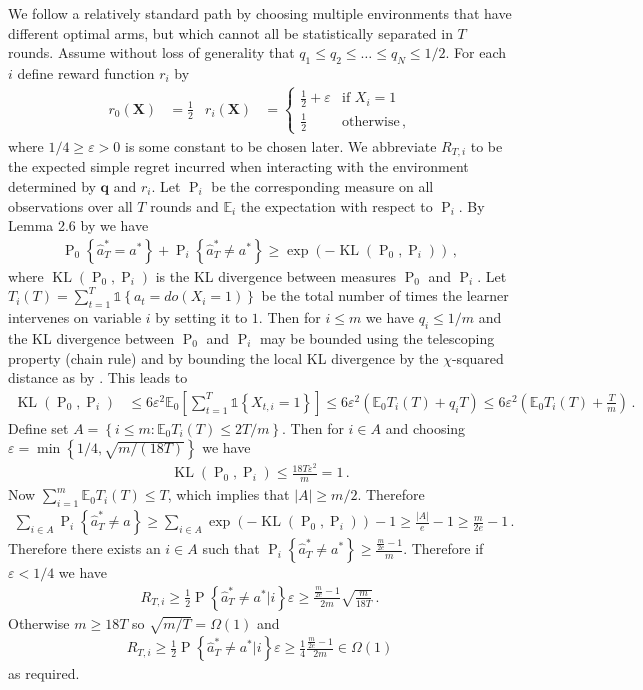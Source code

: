 \documentclass{article}
\newcommand{\set}[1]{\left\{#1\right\}}
\newcommand{\ind}[1]{\mathds{1}\!\!\set{#1}}
\newcommand{\eq}[1]{\begin{align*}#1\end{align*}}
\newcommand{\Pri}[1]{\operatorname{P}_i\left\{#1\right\}}
\newcommand{\Prz}[1]{\operatorname{P}_0\left\{#1\right\}}
\newcommand{\KL}{\operatorname{KL}}
\newcommand{\EE}{\mathbb E}
\newcommand{\Pn}[2]{\operatorname{P}\left\{#2|#1\right\}}
\newcommand{\Ps}{\operatorname{P}}
\theoremstyle{plain}
\theoremstyle{definition}
\let\epsilon\varepsilon
\begin{document}
We follow a relatively standard path by choosing multiple environments that have different optimal arms, but which cannot all be statistically
separated in $T$ rounds.
Assume without loss of generality that $q_1 \leq q_2 \leq \ldots \leq q_N \leq 1/2$.
For each $i$ define reward function $r_i$ by
\eq{
r_0(\boldsymbol{X}) &= \frac{1}{2} &
r_i(\boldsymbol{X}) &= \begin{cases}
\frac{1}{2} + \epsilon & \text{if } X_i = 1 \\
\frac{1}{2} & \text{otherwise}\,,
\end{cases}
}
where $1/4 \geq \epsilon > 0$ is some constant to be chosen later.
We abbreviate $R_{T,i}$ to be the expected simple regret incurred when interacting with the
environment determined by $\boldsymbol{q}$ and $r_i$. Let $\operatorname{P}_i$ be the corresponding measure
on all observations over all $T$ rounds and $\EE_i$ the expectation with respect to $\operatorname{P}_i$. By Lemma 2.6 by \citet{Tsy08} we have
\eq{
\Prz{\hat a^*_T = a^*} + \Pri{\hat a^*_T \neq a^*} \geq \exp\left(-\KL(\operatorname{P}_0, \operatorname{P}_i)\right)\,,
}
where $\KL(\Ps_0, \Ps_i)$ is the KL divergence between measures $\operatorname{P}_0$ and $\operatorname{P}_i$.
Let $T_i(T) = \sum_{t=1}^T \ind{a_t = do(X_i = 1)}$ be the total number of times the learner intervenes on variable $i$ by setting it to $1$.
Then for $i \leq m$ we have $q_i \leq 1/m$ and the KL divergence between $\Ps_0$ and $\Ps_i$ may be bounded using the telescoping property (chain rule) and
by bounding the local KL divergence by the $\chi$-squared distance as by \citet{Auer1995}. This leads to 
\eq{
\KL(\Ps_0, \Ps_i) 
&\leq 6\epsilon^2 \EE_0\left[\sum_{t=1}^T \ind{X_{t,i} = 1}\right] 
\leq 6\epsilon^2 \left(\EE_0 T_i(T) + q_i T\right) 
\leq 6\epsilon^2 \left(\EE_0 T_i(T) + \frac{T}{m}\right)\,.
}
Define set $A = \set{i \leq m : \EE_0 T_i(T) \leq 2T / m}$.
Then for $i \in A$ and choosing $\epsilon = \min\set{1/4, \sqrt{m/(18T)}}$ we have
\eq{
\KL(\Ps_0, \Ps_i) \leq \frac{18T\epsilon^2}{m} = 1\,. 
}
Now $\sum_{i=1}^m \EE_0 T_i(T) \leq T$, which implies that $|A| \geq m/2$.
Therefore
\eq{
\sum_{i \in A} \Pri{\hat a^*_T \neq a} 
\geq \sum_{i \in A} \exp\left(-\KL(\Ps_0, \Ps_i)\right) - 1
\geq \frac{|A|}{e} - 1 
\geq \frac{m}{2e} - 1\,.
}
Therefore there exists an $i \in A$ such that
$\Pri{\hat a^*_T \neq a^*} \geq \frac{\frac{m}{2e} - 1}{m}$. 
Therefore if $\epsilon < 1/4$ we have
\eq{
R_{T,i} \geq \frac{1}{2} \Pn{i}{\hat a^*_T \neq a^*} \epsilon \geq \frac{\frac{m}{2e} - 1}{2m} \sqrt{\frac{m}{18T}}\,.
}
Otherwise $m \geq 18T$ so $\sqrt{m/T} = \Omega(1)$ and
\eq{
R_{T,i} \geq \frac{1}{2} \Pn{i}{\hat a^*_T \neq a^*} \epsilon \geq \frac{1}{4} \frac{\frac{m}{2e} - 1}{2m} \in \Omega(1) 
}
as required.
\end{document}
